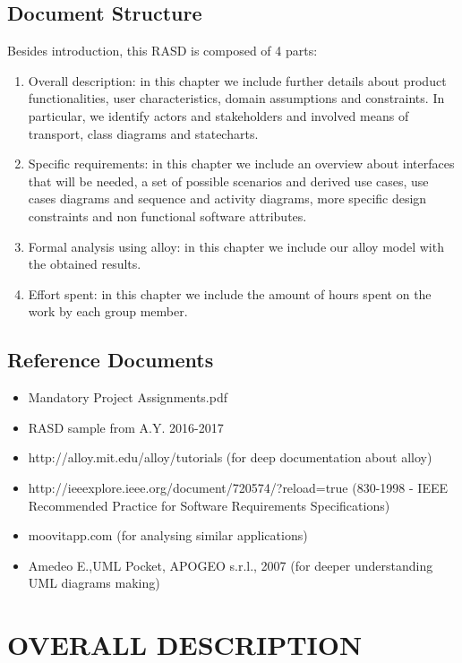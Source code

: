 \documentclass[a4paper,leqno]{book}
\begin{document}
\section{Document Structure}

Besides introduction, this RASD is composed of 4 parts:

\begin{enumerate}
	\item Overall description: in this chapter we include further details about product functionalities, user characteristics, domain assumptions and constraints. In particular, we identify actors and stakeholders and involved means of transport, class diagrams and statecharts.
	\item Specific requirements: in this chapter we include an overview about interfaces that will be needed, a set of possible scenarios and derived use cases, use cases diagrams and sequence and activity diagrams, more specific design constraints and non functional software attributes.
	\item  Formal analysis using alloy: in this chapter we include our alloy model with the obtained results.
	\item  Effort spent: in this chapter we include the amount of hours spent on the work by each group member.
\end{enumerate}

\section{Reference Documents}
\begin{itemize}
	\item Mandatory Project Assignments.pdf
	\item RASD sample from A.Y. 2016-2017
	\item http://alloy.mit.edu/alloy/tutorials (for deep documentation about alloy)
	\item http://ieeexplore.ieee.org/document/720574/?reload=true (830-1998 - IEEE Recommended Practice for Software Requirements Specifications)
	\item moovitapp.com (for analysing similar applications)
	\item Amedeo E.,UML Pocket, APOGEO s.r.l., 2007 (for deeper understanding UML diagrams making) 
\end{itemize}



\chapter{OVERALL DESCRIPTION}
\end{document}
